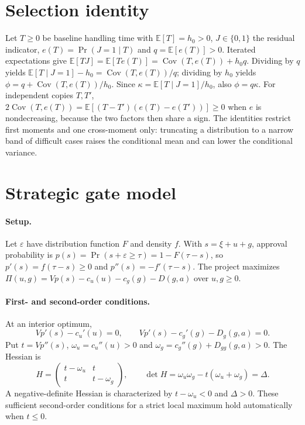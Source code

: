 \documentclass[11pt,a4paper]{article}
\begin{document}
\section{Selection identity}

Let $T\ge 0$ be baseline handling time with $\mathbb{E}[T]=h_0>0$, $J\in\{0,1\}$ the residual
indicator, $e(T)=\Pr(J=1\mid T)$ and $q=\mathbb{E}[e(T)]>0$. Iterated expectations give
$\mathbb{E}[TJ]=\mathbb{E}[Te(T)]=\operatorname{Cov}(T,e(T))+h_0q$. Dividing by $q$ yields
$\mathbb{E}[T\mid J=1]-h_0=\operatorname{Cov}(T,e(T))/q$; dividing by $h_0$ yields
$\phi=q+\operatorname{Cov}(T,e(T))/h_0$. Since $\kappa=\mathbb{E}[T\mid J=1]/h_0$, also $\phi=q\kappa$.
For independent copies $T,T'$,
$2\operatorname{Cov}(T,e(T))=\mathbb{E}[(T-T')(e(T)-e(T'))]\ge 0$ when $e$ is nondecreasing, because
the two factors then share a sign. The identities restrict first moments and one cross-moment only:
truncating a distribution to a narrow band of difficult cases raises the conditional mean and can
lower the conditional variance.

\section{Strategic gate model}

\paragraph{Setup.} Let $\varepsilon$ have distribution function $F$ and density $f$. With
$s=\xi+u+g$, approval probability is $p(s)=\Pr(s+\varepsilon\ge\tau)=1-F(\tau-s)$, so
$p'(s)=f(\tau-s)\ge 0$ and $p''(s)=-f'(\tau-s)$. The project maximizes
$\Pi(u,g)=Vp(s)-c_u(u)-c_g(g)-D(g,a)$ over $u,g\ge 0$.

\paragraph{First- and second-order conditions.} At an interior optimum,
\[
Vp'(s)-c_u'(u)=0,\qquad Vp'(s)-c_g'(g)-D_g(g,a)=0 .
\]
Put $t=Vp''(s)$, $\omega_u=c_u''(u)>0$ and $\omega_g=c_g''(g)+D_{gg}(g,a)>0$. The Hessian is
\[
H=\begin{pmatrix} t-\omega_u & t\\ t & t-\omega_g\end{pmatrix},\qquad
\det H=\omega_u\omega_g-t(\omega_u+\omega_g)=\Delta .
\]
A negative-definite Hessian is characterized by $t-\omega_u<0$ and $\Delta>0$.
These sufficient second-order conditions for a strict local maximum hold automatically when $t\le 0$.
\end{document}

